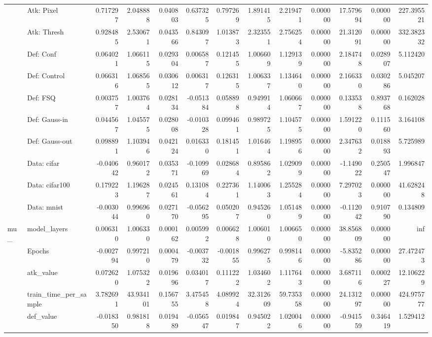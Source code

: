 \begin{table}[htbp]
\begin{tabular}{llrrrrrrrrrrr}
 & Atk: Pixel & 0.717297 & 2.048888 & 0.040803 & 0.637325 & 0.797269 & 1.891415 & 2.219471 & 0.000000 & 17.579694 & 0.000000 & 227.395521 \\
 & Atk: Thresh & 0.928485 & 2.530671 & 0.043566 & 0.843097 & 1.013873 & 2.323551 & 2.756254 & 0.000000 & 21.312091 & 0.000000 & 332.382332 \\
 & Def: Conf & 0.064021 & 1.066115 & 0.029304 & 0.006587 & 0.121455 & 1.006609 & 1.129139 & 0.000000 & 2.184748 & 0.028907 & 5.112420 \\
 & Def: Control & 0.066316 & 1.068565 & 0.030612 & 0.006317 & 0.126315 & 1.006337 & 1.134640 & 0.000000 & 2.166330 & 0.030286 & 5.045207 \\
 & Def: FSQ & 0.003757 & 1.003764 & 0.028134 & -0.051384 & 0.058898 & 0.949914 & 1.060667 & 0.000000 & 0.133538 & 0.893768 & 0.162028 \\
 & Def: Gauss-in & 0.044567 & 1.045575 & 0.028008 & -0.010328 & 0.099461 & 0.989725 & 1.104575 & 0.000000 & 1.591220 & 0.111560 & 3.164108 \\
 & Def: Gauss-out & 0.098891 & 1.103946 & 0.042124 & 0.016330 & 0.181451 & 1.016464 & 1.198956 & 0.000000 & 2.347632 & 0.018893 & 5.725989 \\
 & Data: cifar & -0.040642 & 0.960172 & 0.035371 & -0.109969 & 0.028684 & 0.895862 & 1.029099 & 0.000000 & -1.149022 & 0.250547 & 1.996847 \\
 & Data: cifar100 & 0.179223 & 1.196287 & 0.024561 & 0.131084 & 0.227361 & 1.140063 & 1.255284 & 0.000000 & 7.297023 & 0.000000 & 41.628248 \\
 & Data: mnist & -0.003044 & 0.996960 & 0.027170 & -0.056295 & 0.050207 & 0.945260 & 1.051489 & 0.000000 & -0.112042 & 0.910790 & 0.134809 \\
\cline{1-13}
\multirow[t]{22}{*}{mu\_} & model\_layers & 0.006310 & 1.006330 & 0.000162 & 0.005992 & 0.006628 & 1.006010 & 1.006650 & 0.000000 & 38.856809 & 0.000000 & inf \\
 & Epochs & -0.002794 & 0.997210 & 0.000479 & -0.003732 & -0.001855 & 0.996275 & 0.998146 & 0.000000 & -5.835286 & 0.000000 & 27.472473 \\
 & atk\_value & 0.072620 & 1.075322 & 0.019696 & 0.034017 & 0.111222 & 1.034602 & 1.117643 & 0.000000 & 3.687116 & 0.000227 & 12.106229 \\
 & train\_time\_per\_sample & 3.782691 & 43.934101 & 0.156755 & 3.475458 & 4.089924 & 32.312609 & 59.735358 & 0.000000 & 24.131297 & 0.000000 & 424.975777 \\
 & def\_value & -0.018350 & 0.981818 & 0.019489 & -0.056547 & 0.019847 & 0.945022 & 1.020046 & 0.000000 & -0.941559 & 0.346419 & 1.529412 \\

\end{tabular}
\end{table}
